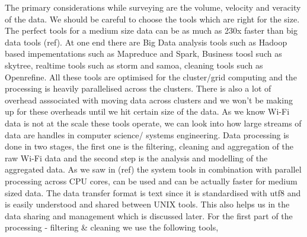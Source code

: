 The primary considerations while surveying are the volume, velocity and veracity
of the data.
We should be careful to choose the tools which are right for the size.
The perfect tools for a medium size data can be as much as 230x faster than big data tools (ref).
At one end there are Big Data analysis tools such as Hadoop based impementations such as Mapreduce and Spark, Business toosl such as skytree, realtime tools such as storm and samoa, cleaning tools such as Openrefine.
All these tools are optimised for the cluster/grid computing and the processing is heavily parallelised across the clusters.
There is also a lot of overhead asssociated with moving data across clusters and we won't be making up for these overheads until we hit certain size of the data.
As we know Wi-Fi data is not at the scale these tools operate, we can look into how large streams of data are handles in computer science/ systems engineering.
Data processing is done in two stages, the first one is the filtering, cleaning and aggregation of the raw Wi-Fi data and the second step is the analysis and modelling of the aggregated data.
As we saw in (ref) the system tools in combination with parallel processing across CPU cores, can be used and can be actually faster for medium sized data.
The data transfer format is text since it is standardised with utf8 and is easily understood and shared between UNIX tools.
This also helps us in the data sharing and management which is discussed later.
For the first part of the processing - filtering \& cleaning we use the following tools,

